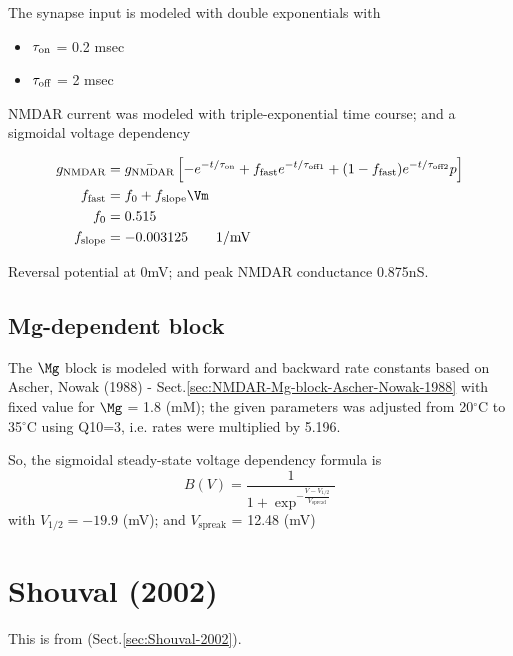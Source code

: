 The synapse input is modeled with double exponentials with
\begin{itemize}
  \item $\tau_{\text{on}}$  = 0.2 msec
  
  \item $\tau_{\text{off}}$ = 2 msec
\end{itemize}

NMDAR current was modeled with triple-exponential time course; and a sigmoidal
voltage dependency

\def\slope{{{\text{slope}}}}
\def\fast{{{\text{fast}}}}
\begin{equation}
\begin{split}
g_\NMDA &= \bar{g_\NMDA} \left[ -e ^{-t/\tau_\on} + f_\fast e^{-t/\tau_{\off1}}
+ (1-f_\fast) e^{-t/\tau_{\off2}} p
\right]  \\
f_\fast &= f_0 + f_\slope \Vm \\
f_0 &= 0.515 \\
f_\slope &= -0.003125 \qquad \text{1/mV}
\end{split}
\end{equation}

Reversal potential at 0mV; and peak NMDAR conductance
0.875nS.

\subsection{Mg-dependent block}
\label{sec:NMDAR-Mg-block-Major-Tank-2008}


The $\Mg$ block is modeled with forward and backward rate constants based on
Ascher, Nowak (1988) - Sect.\ref{sec:NMDAR-Mg-block-Ascher-Nowak-1988} with 
fixed value for $\Mg$ = 1.8 (mM); the given parameters was adjusted from
20$^\circ$C to 35$^\circ$C using Q10=3, i.e. rates were multiplied by 5.196.

So, the sigmoidal steady-state voltage dependency formula is
\begin{equation}
B(V) = \frac{1}{1+ \exp^{-\frac{V-V_{1/2}}{V_\text{spread}}}}
\end{equation}
with $V_{1/2} = -19.9$ (mV); and $V_\text{spreak}$ = 12.48 (mV)


\section{Shouval (2002)}
\label{sec:NMDAR-Shouval (2002)}

This is from \citep{shouval2002} (Sect.\ref{sec:Shouval-2002}).

